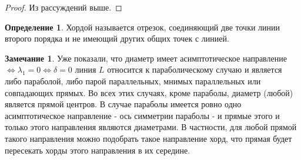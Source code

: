 \documentclass[a4paper, 12pt]{article}
\theoremstyle{definition}
\newtheorem*{definition}{Определение}
\newtheorem*{remark}{Замечание}
\begin{document}
	\begin{proof}
		Из рассуждений выше.
	\end{proof}
	\begin{definition}
		Хордой называется отрезок, соединяющий две точки линии второго порядка и не имеющий других общих точек с линией.
	\end{definition}
	\begin{remark}
		Уже показали, что диаметр имеет асимптотическое направление $\Leftrightarrow \lambda_1 = 0 \Leftrightarrow \delta = 0$ линия $L$ относится к параболическому случаю и является либо параболой, либо парой параллельных, мнимых параллельных или совпадающих прямых. Во всех этих случаях, кроме параболы, диаметр (любой) является прямой центров. В случае параболы имеется ровно одно асимптотическое направление - ось симметрии параболы - и прямые этого и только этого направления являются диаметрами. В частности, для любой прямой такого направления можно подобрать такое направление хорд, что прямая будет пересекать хорды этого направления в их середине.
	\end{remark}
\end{document}
